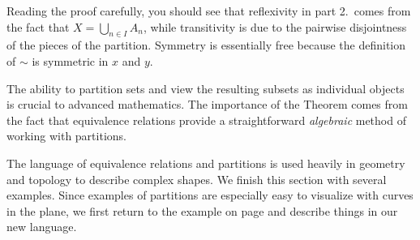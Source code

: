 Reading the proof carefully, you should see that reflexivity in part 2.\ comes from the fact that $X=\bigcup\limits_{n\in I}A_n$, while transitivity is due to the pairwise disjointness of the pieces of the partition. Symmetry is essentially free because the definition of $\sim$ is symmetric in $x$ and $y$.\par

The ability to partition sets and view the resulting subsets as individual objects is crucial to advanced mathematics. The importance of the Theorem comes from the fact that equivalence relations provide a straightforward \emph{algebraic} method of working with partitions.



The language of equivalence relations and partitions is used heavily in geometry and topology to describe complex shapes. We finish this section with several examples. Since examples of partitions are especially easy to visualize with curves in the plane, we first return to the example on page \pageref{ex:equivcircle} and describe things in our new language.

